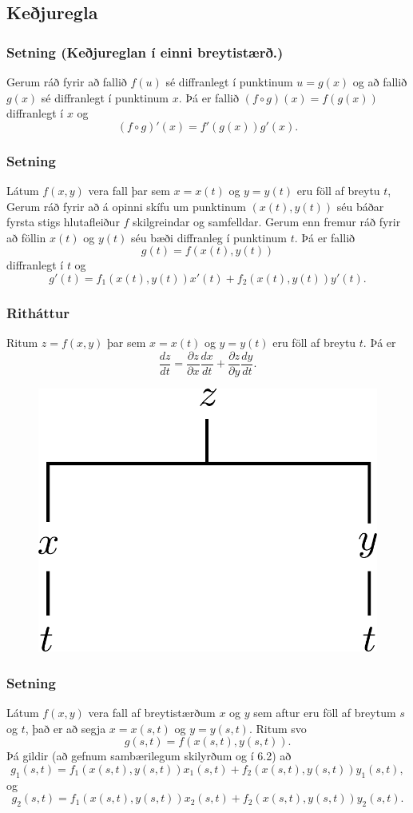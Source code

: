  


\subsection{Keðjuregla} 

\subsubsection{Setning  (Keðjureglan í einni breytistærð.)}
 Gerum ráð fyrir að fallið $f(u)$ sé diffranlegt í punktinum $u=g(x)$ og að fallið $g(x)$ sé diffranlegt í punktinum $x$.  Þá er fallið $(f\circ g)(x)=f(g(x))$ diffranlegt í $x$ og 
$$(f\circ g)'(x)=f'(g(x))g'(x).$$


\subsubsection{Setning }
Látum $f(x,y)$ vera fall þar sem $x=x(t)$ og $y=y(t)$ eru föll af breytu $t$,  Gerum ráð fyrir að á opinni skífu um  punktinum $(x(t),y(t))$ séu báðar fyrsta stigs hlutafleiður $f$ skilgreindar og samfelldar.   Gerum enn fremur ráð fyrir að föllin $x(t)$ og $y(t)$ séu bæði diffranleg í punktinum $t$.  Þá er fallið 
$$g(t)=f(x(t),y(t))$$
diffranlegt í $t$ og 
$$g'(t)=f_1(x(t),y(t))x'(t)+f_2(x(t),y(t))y'(t).$$



\subsubsection{Ritháttur }

Ritum $z=f(x,y)$ þar sem $x=x(t)$ og $y=y(t)$ eru föll af breytu $t$.  Þá er 
$$\frac{dz}{dt}=\frac{\partial z}{\partial x}\frac{dx}{dt}
+\frac{\partial z}{\partial y}\frac{dy}{dt}.$$

 \begin{figure}[h!]
           \centering
            \includegraphics[width=0.3\linewidth]{chain1}
    \end{figure}


\subsubsection{Setning }
 Látum $f(x,y)$ vera fall af breytistærðum $x$ og $y$ sem aftur eru föll af breytum $s$ og $t$, það er að segja 
$x=x(s,t)$ og $y=y(s,t)$.  Ritum svo 
$$g(s,t)=f(x(s,t),y(s,t)).$$
Þá gildir (að gefnum sambærilegum skilyrðum og í 6.2) að
$$g_1(s,t)=f_1(x(s,t),y(s,t))x_1(s,t)+f_2(x(s,t),y(s,t))y_1(s,t),$$
og 
$$g_2(s,t)=f_1(x(s,t),y(s,t))x_2(s,t)+f_2(x(s,t),y(s,t))y_2(s,t).$$



